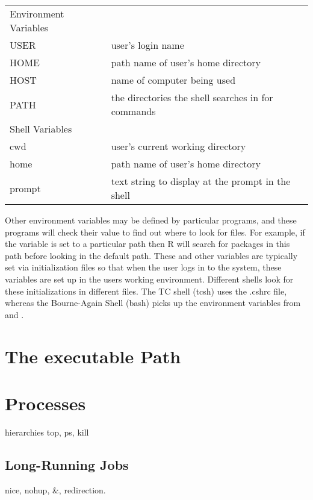 \begin{table}
\begin{tabular}{ll}
\hline
Environment Variables & \\
USER & user's login name\\
HOME & path name of user's home directory\\
HOST & name of computer being used \\
PATH & the directories the shell searches in for commands\\
\hline
Shell Variables & \\
cwd & user's current working directory\\
home & path name of user's home directory \\
prompt & text string to display at the prompt in the shell\\
\end{tabular}
\end{table}

Other environment variables may be defined by particular programs, and
these programs will check their value to find out where to look for
files. For example, if the  variable is set to a
particular path then R will search for packages in this path before
looking in the default path.  These and other variables are typically
set via initialization files so that when the user logs in to the
system, these variables are set up in the users working
environment. Different shells look for these initializations in different
files. The TC shell (tcsh) uses the .cshrc file, whereas the
Bourne-Again Shell (bash) picks up the environment variables from
 and .  

\section{The executable Path}
  

\section{Processes}
hierarchies
top, ps, kill

\subsection{Long-Running Jobs}
nice, nohup, \&, redirection.



